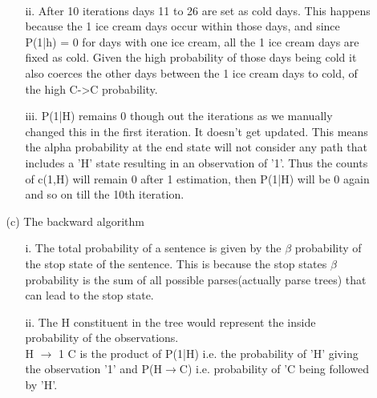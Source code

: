 \documentclass{article}
\begin{document}
\begin{enumerate}
\begin{enumerate}
\begin{enumerate}
        \\
        \item[ii.] After 10 iterations days 11 to 26 are set as cold days. This happens because the 1 ice cream days occur within those days, and since P(1|h) = 0 for days with one ice cream, all the 1 ice cream days are fixed as cold. Given the high probability of those days being cold it also coerces the other days between the 1 ice cream days to cold, of the high C->C probability.
        \\
        \item[iii.]P(1|H) remains 0 though out the iterations as we manually changed this in the first iteration. It doesn't get updated. This means the alpha probability at the end state will not consider any path that includes a 'H' state resulting in an observation of '1'. Thus the counts of c(1,H) will remain 0 after 1 estimation, then P(1|H) will be 0 again and so on till the 10th iteration.
    \end{enumerate}
    \item[(c)]The backward algorithm
    \begin{enumerate}
        \item[i.]The total probability of a sentence is given by the $\beta$ probability of the stop state of the sentence. This is because the stop states $\beta$ probability is the sum of all possible parses(actually parse trees) that can lead to the stop state.
        \item[ii.]The H constituent in the tree would represent the inside probability of the observations. 
        \\H $\rightarrow$ 1 C is the product of P(1|H) i.e. the probability of 'H' giving the observation '1' and P(H$\rightarrow$C) i.e. probability of 'C being followed by 'H'.


\end{enumerate}
\end{enumerate}
\end{enumerate}
\end{document}
